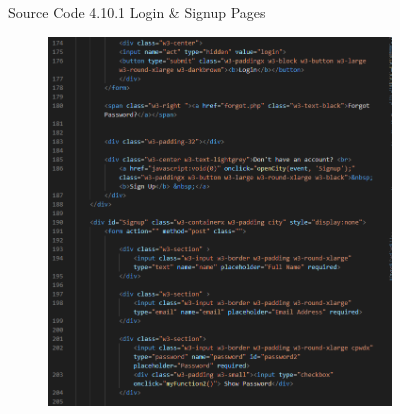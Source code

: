\begin{enumerate}[1.]
\begin{figure}[h]
\begin{subfigure}[b]{0.8\textwidth}
            \label{fig:sub2}
        \end{subfigure}
        \caption*{Source Code 4.10.1 Login \& Signup Pages}
        \label{fig:myfig49a}
    \end{figure}
    \clearpage
    \begin{figure}[h]\ContinuedFloat
        \centering
        \begin{subfigure}[b]{0.7\textwidth}
            \centering
            \includegraphics[width=\textwidth]{mainmatter/images/frontend/code/loginsignup3.png}
            \label{fig:sub3}
        \end{subfigure}
        \hspace{0.05\textwidth}
        \begin{subfigure}[b]{0.7\textwidth}
            \centering

\end{subfigure}
\end{figure}
\end{enumerate}
